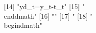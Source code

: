  [14] "{yd_{t}}={y_{t}}-{t_{t}}"                                                                                                                                                                                                                                                                                                                                                                                                                                                                                                                                                                                                                     
 [15] "\\end{dmath}"                                                                                                                                                                                                                                                                                                                                                                                                                                                                                                                                                                                                                                 
 [16] ""                                                                                                                                                                                                                                                                                                                                                                                                                                                                                                                                                                                                                                             
 [17] "%
 [18] "\\begin{dmath}"                                                                                                                                                                                                                                                                                                                                                                                                                                                                                                                                                                                                                               
